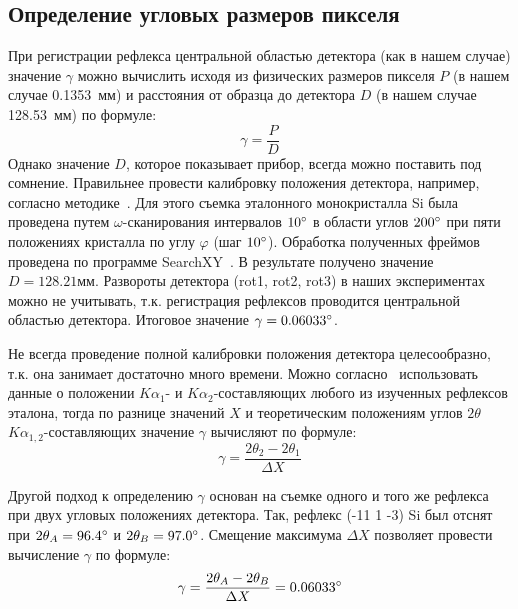 \subsection{Определение угловых размеров пикселя}

При регистрации рефлекса центральной областью детектора (как в нашем случае) значение $\gamma$ можно вычислить исходя из физических размеров пикселя $P$ (в нашем случае 0.1353~мм) и расстояния от образца до детектора $D$ (в нашем случае 128.53~мм) по формуле:
\begin{equation}\label{eq:pixsize}
    \gamma = \frac{P}{D}
\end{equation}
Однако значение $D$, которое показывает прибор, всегда можно поставить под сомнение.
Правильнее провести калибровку положения детектора, например, согласно методике~\cite{Panchenko:2023}.
Для этого съемка эталонного монокристалла Si была проведена путем $\omega$-сканирования интервалов $10^\circ$ в области углов $200^\circ$ при пяти положениях кристалла по углу $\varphi$ (шаг $10^\circ$).
Обработка полученных фреймов проведена по программе SearchXY~\cite{Panchenko:2023}.
В результате получено значение $D = 128.21\unit{мм}$.
Развороты детектора (rot1, rot2, rot3) в наших экспериментах можно не учитывать, т.к. регистрация рефлексов проводится центральной областью детектора.
Итоговое значение $\gamma = 0.06033^\circ$.

Не всегда проведение полной калибровки положения детектора целесообразно, т.к. она занимает достаточно много времени.
Можно согласно~\cite{Gromilov:2022} использовать данные о положении $K\alpha_1$- и $K\alpha_2$-составляющих любого из изученных рефлексов эталона, тогда по разнице значений $X$ и теоретическим положениям углов $2\theta$  $K\alpha_{1,2}$-составляющих значение $\gamma$ вычисляют по формуле:
\begin{equation}\label{eq:pixsize_exp}
    \gamma = \frac{2\theta_2 - 2\theta_1}{\Delta X}
\end{equation}

Другой подход к определению $\gamma$ основан на съемке одного и того же рефлекса при двух угловых положениях детектора.
Так, рефлекс \hkl(-11 1 -3) Si был отснят при $2\theta_A = 96.4^\circ$ и $2\theta_B = 97.0^\circ$.
Смещение максимума $\Delta X$ позволяет провести вычисление $\gamma$ по формуле:
\begin{equation}\label{eq:pixsize_exp_2}
    \gamma = \frac{2\theta_A - 2\theta_B}{\Delta X} = 0.06033^\circ
\end{equation}


